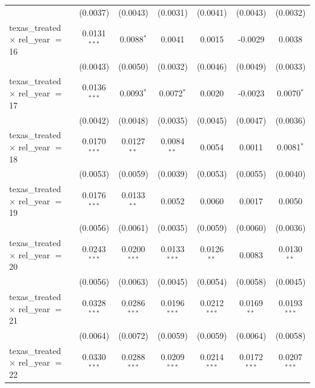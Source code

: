 \begin{tabular}{lcccccc}
                                                & (0.0037)       & (0.0043)       & (0.0031)        & (0.0041)        & (0.0043)        & (0.0032)\\   
   texas\_treated $\times$ rel\_year $=$ 16     & 0.0131$^{***}$ & 0.0088$^{*}$   & 0.0041          & 0.0015          & -0.0029         & 0.0038\\   
                                                & (0.0043)       & (0.0050)       & (0.0032)        & (0.0046)        & (0.0049)        & (0.0033)\\   
   texas\_treated $\times$ rel\_year $=$ 17     & 0.0136$^{***}$ & 0.0093$^{*}$   & 0.0072$^{*}$    & 0.0020          & -0.0023         & 0.0070$^{*}$\\   
                                                & (0.0042)       & (0.0048)       & (0.0035)        & (0.0045)        & (0.0047)        & (0.0036)\\   
   texas\_treated $\times$ rel\_year $=$ 18     & 0.0170$^{***}$ & 0.0127$^{**}$  & 0.0084$^{**}$   & 0.0054          & 0.0011          & 0.0081$^{*}$\\   
                                                & (0.0053)       & (0.0059)       & (0.0039)        & (0.0053)        & (0.0055)        & (0.0040)\\   
   texas\_treated $\times$ rel\_year $=$ 19     & 0.0176$^{***}$ & 0.0133$^{**}$  & 0.0052          & 0.0060          & 0.0017          & 0.0050\\   
                                                & (0.0056)       & (0.0061)       & (0.0035)        & (0.0059)        & (0.0060)        & (0.0036)\\   
   texas\_treated $\times$ rel\_year $=$ 20     & 0.0243$^{***}$ & 0.0200$^{***}$ & 0.0133$^{***}$  & 0.0126$^{**}$   & 0.0083          & 0.0130$^{**}$\\   
                                                & (0.0056)       & (0.0063)       & (0.0045)        & (0.0054)        & (0.0058)        & (0.0045)\\   
   texas\_treated $\times$ rel\_year $=$ 21     & 0.0328$^{***}$ & 0.0286$^{***}$ & 0.0196$^{***}$  & 0.0212$^{***}$  & 0.0169$^{**}$   & 0.0193$^{***}$\\   
                                                & (0.0064)       & (0.0072)       & (0.0059)        & (0.0059)        & (0.0064)        & (0.0058)\\   
   texas\_treated $\times$ rel\_year $=$ 22     & 0.0330$^{***}$ & 0.0288$^{***}$ & 0.0209$^{***}$  & 0.0214$^{***}$  & 0.0172$^{***}$  & 0.0207$^{***}$\\   

\end{tabular}
